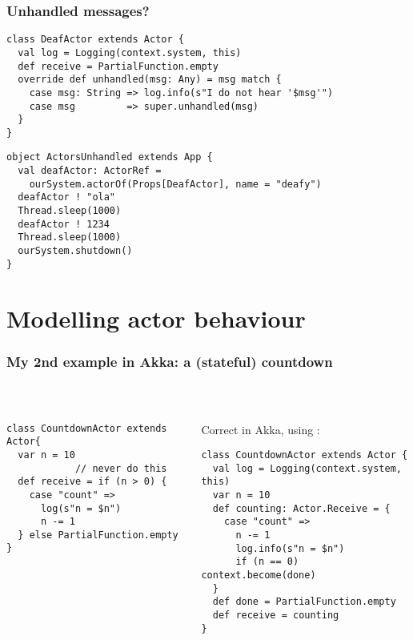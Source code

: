 \documentclass[aspectratio=169]{beamer}
\begin{document}
\begin{frame}[fragile]\frametitle{Unhandled messages?}

\begin{lstlisting}[emph={Actor, Logging, Props, ourSystem,shutdown,sleep,actorOf,receive,unhandled}]
class DeafActor extends Actor {
  val log = Logging(context.system, this)
  def receive = PartialFunction.empty
  override def unhandled(msg: Any) = msg match {
    case msg: String => log.info(s"I do not hear '$msg'")
    case msg         => super.unhandled(msg)
  }
}
\end{lstlisting}
    
\begin{lstlisting}[emph={Actor, Logging, Props, ourSystem,shutdown,sleep,actorOf}]
object ActorsUnhandled extends App {
  val deafActor: ActorRef =
    ourSystem.actorOf(Props[DeafActor], name = "deafy")
  deafActor ! "ola"
  Thread.sleep(1000)
  deafActor ! 1234
  Thread.sleep(1000)
  ourSystem.shutdown()
}
\end{lstlisting}
\end{frame}


\section{Modelling actor behaviour}

\begin{frame}[fragile]\frametitle{My 2nd example in Akka: a (stateful) countdown}
~\\[-6mm]
\begin{columns}
\begin{column}{0.48\textwidth}
\begin{lstlisting}[emph={Actor, Logging, Props, ourSystem,shutdown,sleep,actorOf,receive}]
class CountdownActor extends Actor{
  var n = 10
            // never do this
  def receive = if (n > 0) {
    case "count" =>
      log(s"n = $n")
      n -= 1
  } else PartialFunction.empty
}
\end{lstlisting}
\end{column}
\begin{column}{0.52\textwidth}
\pause
\alert{Correct in Akka, using :}
\begin{lstlisting}[emph={Actor, Logging, Props, ourSystem,shutdown,sleep,actorOf,receive,become}]
class CountdownActor extends Actor {
  val log = Logging(context.system, this)
  var n = 10
  def counting: Actor.Receive = {
    case "count" =>
      n -= 1
      log.info(s"n = $n")
      if (n == 0) context.become(done)
  }
  def done = PartialFunction.empty
  def receive = counting
}
\end{lstlisting}
\end{column}
\end{columns}
\end{frame}
\end{document}
